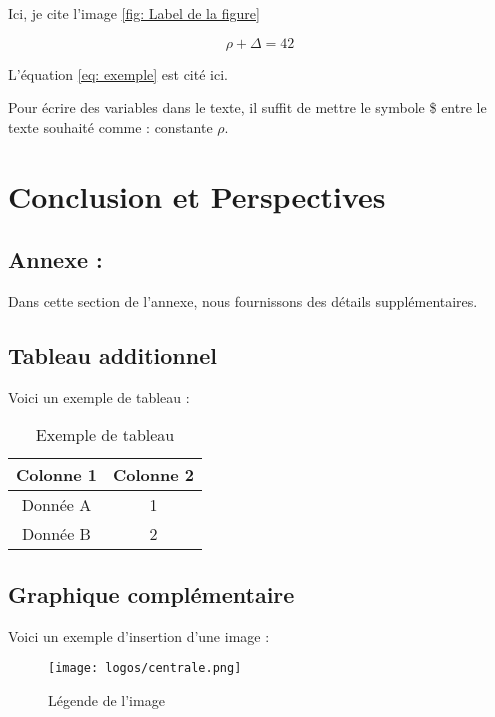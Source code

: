 \documentclass{rapportECC}
\begin{document}

Ici, je cite l'image \ref{fig: Label de la figure}



\begin{equation} \label{eq: exemple}
\rho + \Delta = 42
\end{equation}

L'équation \ref{eq: exemple} est cité ici. 


Pour écrire des variables dans le texte, il suffit de mettre le symbole \$ entre le texte souhaité comme : constante $\rho$. \cite{Companion}


\section{Conclusion et Perspectives}
\lipsum[1-2] \cite{matsumoto_tracking_2013}

\newpage


\printbibliography

\newpage
\begin{appendices}
\section{Annexe : }
Dans cette section de l'annexe, nous fournissons des détails supplémentaires.

\subsection{Tableau additionnel}
Voici un exemple de tableau :
\begin{table}[h]
    \centering
    \begin{tabular}{|c|c|}
    \hline
    Colonne 1 & Colonne 2 \\
    \hline
    Donnée A & 1 \\
    Donnée B & 2 \\
    \hline
    \end{tabular}
    \caption{Exemple de tableau}
\end{table}

\subsection{Graphique complémentaire}
Voici un exemple d'insertion d'une image :
\begin{figure}[h]
    \centering
    \texttt{[image: logos/centrale.png]}
    \caption{Légende de l'image}
\end{figure}
\end{appendices}
\end{document}
